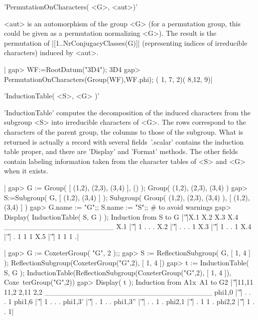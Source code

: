 'PermutationOnCharacters( <G>, <aut>)'

<aut>  is an automorphism of  the group <G> (for  a permutation group, this
could  be  given  as  a  permutation  normalizing  <G>).  The result is the
permutation of |[1..NrConjugacyClasses(G)]|   (representing    indices   of
irreducible characters) induced by <aut>.

|    gap> WF:=RootDatum("3D4");                     
    3D4
    gap> PermutationOnCharacters(Group(WF),WF.phi);
    ( 1, 7, 2)( 8,12, 9)|

%

'InductionTable( <S>, <G> )'

'InductionTable'  computes the decomposition of the induced characters from
the subgroup <S> into irreducible characters of <G>. The rows correspond to
the  characters of the parent group, the  columns to those of the subgroup.
What  is returned  is actually  a record  with several  fields\:\ '.scalar'
contains  the induction table proper, and  there are 'Display' and 'Format'
methods.  The  other  fields  contain  labeling  information taken from the
character tables of <S> and <G> when it exists.

|    gap> G := Group( [ (1,2), (2,3), (3,4) ], () );
    Group( (1,2), (2,3), (3,4) )
    gap> S:=Subgroup( G, [ (1,2), (3,4) ] );
    Subgroup( Group( (1,2), (2,3), (3,4) ), [ (1,2), (3,4) ] )
    gap> G.name := "G";; S.name := "S";; # to avoid warnings
    gap> Display( InductionTable( S, G ) );
    Induction from S to G
        |'\|'|X.1 X.2 X.3 X.4
    _____________________
    X.1 |'\|'|  1   .   .   .
    X.2 |'\|'|  .   .   .   1
    X.3 |'\|'|  1   .   .   1
    X.4 |'\|'|  .   1   1   1
    X.5 |'\|'|  1   1   1   .|

|    gap> G := CoxeterGroup( "G", 2 );;
    gap> S := ReflectionSubgroup( G, [ 1, 4 ] );
    ReflectionSubgroup(CoxeterGroup("G",2), [ 1, 4 ])
    gap> t := InductionTable( S, G );
    InductionTable(ReflectionSubgroup(CoxeterGroup("G",2), [ 1, 4 ]), Coxe\
    terGroup("G",2))
    gap> Display( t );
    Induction from A1x~A1 to G2
               |'\|'|11,11 11,2 2,11 2,2
    ________________________________
    phi{1,0}   |'\|'|    .    .    .   1
    phi{1,6}   |'\|'|    1    .    .   .
    phi{1,3}'  |'\|'|    .    1    .   .
    phi{1,3}'' |'\|'|    .    .    1   .
    phi{2,1}   |'\|'|    .    1    1   .
    phi{2,2}   |'\|'|    1    .    .   1|

